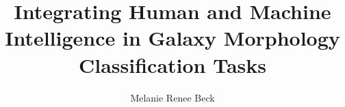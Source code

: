 \phd %

\title{\bf Integrating Human and Machine Intelligence in Galaxy Morphology Classification Tasks}
\author{Melanie Renee Beck}


\abstract{}
\copyrightpage %
\acknowledgements{}
\dedication{}


\beforepreface 

\figurespage
\tablespage

\afterpreface            
